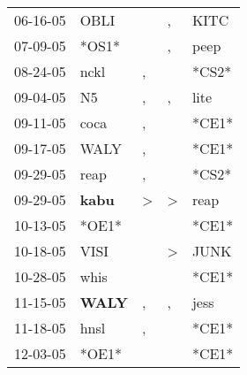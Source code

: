 \begin{supertabular}{p{0.07\textwidth}p{0.06\textwidth}p{0.02\textwidth}p{0.02\textwidth}p{0.06\textwidth}}
          06-16-05\textsuperscript{} &           OBLI\textsuperscript{} &                  &                , &           KITC\textsuperscript{} \\
          07-09-05\textsuperscript{} &                            *OS1* &                  &                , &           peep\textsuperscript{} \\
          08-24-05\textsuperscript{} &           nckl\textsuperscript{} &                , &                  &                            *CS2* \\
          09-04-05\textsuperscript{} &             N5\textsuperscript{} &                , &                , &           lite\textsuperscript{} \\
          09-11-05\textsuperscript{} &           coca\textsuperscript{} &                , &                  &                            *CE1* \\
          09-17-05\textsuperscript{} &           WALY\textsuperscript{} &                , &                  &                            *CE1* \\
          09-29-05\textsuperscript{} &           reap\textsuperscript{} &                , &                  &                            *CS2* \\
          09-29-05\textsuperscript{} &  \textbf{kabu\textsuperscript{}} &     \textgreater &     \textgreater &           reap\textsuperscript{} \\
          10-13-05\textsuperscript{} &                            *OE1* &                  &                  &                            *CE1* \\
          10-18-05\textsuperscript{} &           VISI\textsuperscript{} &                  &     \textgreater &           JUNK\textsuperscript{} \\
          10-28-05\textsuperscript{} &           whis\textsuperscript{} &                  &                  &                            *CE1* \\
          11-15-05\textsuperscript{} &  \textbf{WALY\textsuperscript{}} &                , &                , &           jess\textsuperscript{} \\
          11-18-05\textsuperscript{} &           hnsl\textsuperscript{} &                , &                  &                            *CE1* \\
          12-03-05\textsuperscript{} &                            *OE1* &                  &                  &                            *CE1* \\

\end{supertabular}
